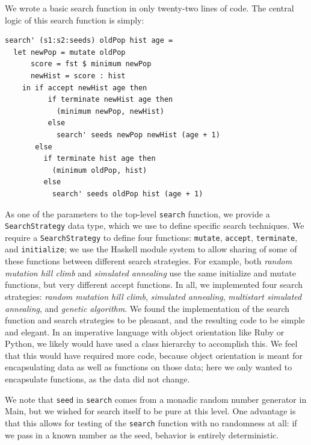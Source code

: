 \documentclass[preprint,nonatbib,blockstyle,nocopyrightspace,times]{sigplanconf}
\begin{document}
We wrote a basic search function in only twenty-two lines of code.
The central logic of this search function is simply:
\begin{verbatim}
search' (s1:s2:seeds) oldPop hist age =
  let newPop = mutate oldPop
      score = fst $ minimum newPop
      newHist = score : hist
    in if accept newHist age then
          if terminate newHist age then
            (minimum newPop, newHist)
          else
            search' seeds newPop newHist (age + 1)
       else
         if terminate hist age then
           (minimum oldPop, hist)
         else
           search' seeds oldPop hist (age + 1)
\end{verbatim}
As one of the parameters to the top-level \texttt{search} function,
we provide a \texttt{SearchStrategy} data type, which we use to 
define specific search techniques.
We require a \texttt{SearchStrategy} to 
define four functions: \texttt{mutate}, \texttt{accept}, \texttt{terminate}, 
and \texttt{initialize}; we use the Haskell module system to allow sharing of 
some of these functions between different search strategies.
For example, both 
\textit{random mutation hill climb} and \textit{simulated annealing} use the 
same initialize and mutate functions, but very different accept functions.
In 
all, we implemented four search strategies: \textit{random mutation hill 
climb}, \textit{simulated annealing}, \textit{multistart simulated annealing}, 
and \textit{genetic algorithm}.
We found the implementation of the search 
function and search strategies to be pleasant, and the resulting code to be 
simple and elegant.
In an imperative language with object orientation like Ruby 
or Python, we likely would have used a class hierarchy to accomplish this.
We 
feel that this would have required more code, because object orientation is 
meant for encapsulating data as well as functions on those data; here we only 
wanted to encapsulate functions, as the data did not change.


We note that \texttt{seed} in \texttt{search} comes from a monadic random 
number generator in Main, but we wished for search itself to be pure at this 
level.
One advantage is that this allows for testing of the \texttt{search} 
function with no randomness at all: if we pass in a known number as the seed, 
behavior is entirely deterministic.
\end{document}
